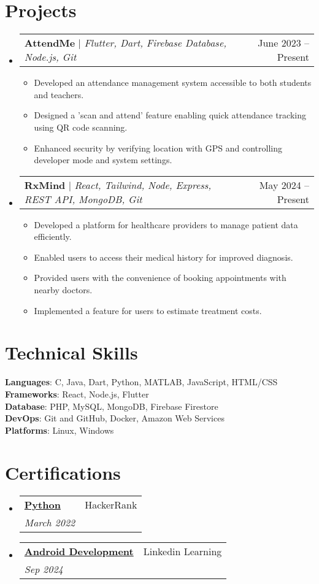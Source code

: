 \documentclass[letterpaper,11pt]{article}
\makeatletter
\newcommand{\resumeItem}[1]{
  \item\small{
    {#1 \vspace{-2pt}}
  }
}
\newcommand{\resumeSubheading}[4]{
  \vspace{-2pt}\item
    \begin{tabular*}{0.97\textwidth}[t]{l@{\extracolsep{\fill}}r}
      \textbf{#1} & #2 \\
      \textit{\small#3} & \textit{\small #4} \\
    \end{tabular*}\vspace{-7pt}
}
\newcommand{\resumeProjectHeading}[2]{
    \item
    \begin{tabular*}{0.97\textwidth}{l@{\extracolsep{\fill}}r}
      \small#1 & #2 \\
    \end{tabular*}\vspace{-7pt}
}
\newcommand{\resumeSubHeadingListStart}{\begin{itemize}[leftmargin=0.15in, label={}]}
\newcommand{\resumeSubHeadingListEnd}{\end{itemize}}
\newcommand{\resumeItemListStart}{\begin{itemize}}
\newcommand{\resumeItemListEnd}{\end{itemize}\vspace{-5pt}}
\makeatother
\begin{document}
\section{Projects}
  \resumeSubHeadingListStart
    \resumeProjectHeading
        {\textbf{AttendMe} $|$ \emph{Flutter, Dart, Firebase Database, Node.js, Git}}{June 2023 -- Present}
        \resumeItemListStart
          \resumeItem{Developed an attendance management system accessible to both students and teachers.}
          \resumeItem{Designed a 'scan and attend' feature enabling quick attendance tracking using QR code scanning.}
          \resumeItem{Enhanced security by verifying location with GPS and controlling developer mode and system settings.}
        \resumeItemListEnd
    \resumeProjectHeading
        {\textbf{RxMind} $|$ \emph{React, Tailwind, Node, Express, REST API, MongoDB, Git}}{May 2024 -- Present}
        \resumeItemListStart
          \resumeItem{Developed a platform for healthcare providers to manage patient data efficiently.}
          \resumeItem{Enabled users to access their medical history for improved diagnosis.}
          \resumeItem{Provided users with the convenience of booking appointments with nearby doctors.}
          \resumeItem{Implemented a feature for users to estimate treatment costs.}
        \resumeItemListEnd
  \resumeSubHeadingListEnd

\section{Technical Skills}
 \begin{itemize}[leftmargin=0.15in, label={}]
    \small{\item{
     \textbf{Languages}{: C, Java, Dart, Python, MATLAB, JavaScript, HTML/CSS} \\
     \textbf{Frameworks}{: React, Node.js, Flutter} \\ 
     \textbf{Database}{: PHP, MySQL, MongoDB, Firebase Firestore} \\ 
     \textbf{DevOps}{: Git and GitHub, Docker, Amazon Web Services} \\
     \textbf{Platforms}{: Linux, Windows}
    }}
 \end{itemize}

\section{Certifications}
  \resumeSubHeadingListStart
    \resumeSubheading
      {\href{https://www.hackerrank.com/certificates/dd8f41e196fa} {Python}}{HackerRank}{March 2022}{}
    \resumeSubheading
      {\href{https://www.linkedin.com/learning/certificates/f1ad0fee7918badf79380b7ca9f8150092891eb43e30236ca0efa3602884c9bd?u=229219690}{Android Development}}
      {Linkedin Learning}{Sep 2024}{}
  \resumeSubHeadingListEnd

\end{document}
